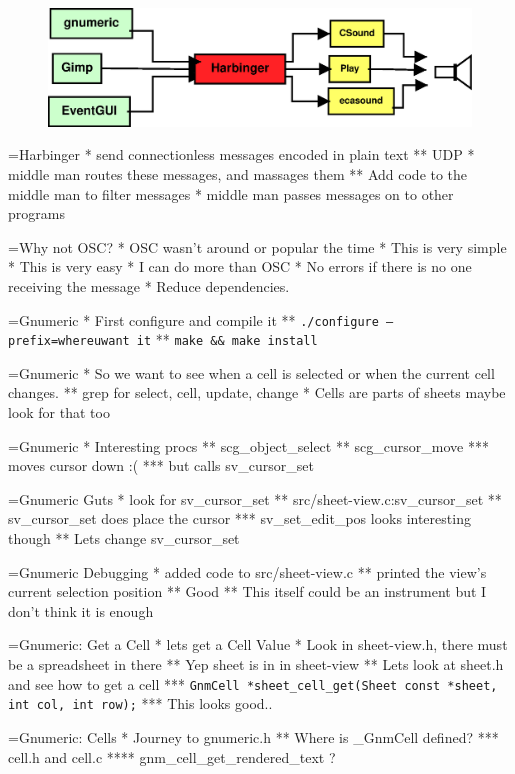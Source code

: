 \documentclass[titlepage,usenames,a4,landscape,semhelv]{seminar}
\begin{document}
\begin{slide}
\newslide

\begin{figure}
  \centering
\includegraphics[width=\textwidth]{harbinger-example}
\end{figure}


=Harbinger
* send connectionless messages encoded in plain text
** UDP
* middle man routes these messages, and massages them
** Add code to the middle man to filter messages
* middle man passes messages on to other programs
 
=Why not OSC?
* OSC wasn't around or popular the time
* This is very simple
* This is very easy
* I can do more than OSC
* No errors if there is no one receiving the message
* Reduce dependencies.

=Gnumeric
* First configure and compile it
** \texttt{./configure --prefix=whereuwant it}
** \texttt{make \&\& make install}

=Gnumeric
* So we want to see when a cell is selected or when the current cell changes.
** grep for select, cell, update, change
* Cells are parts of sheets maybe look for that too

=Gnumeric
* Interesting procs
** scg\_object\_select
** scg\_cursor\_move
*** moves cursor down :(
*** but calls sv\_cursor\_set

=Gnumeric Guts
* look for sv\_cursor\_set
** src/sheet-view.c:sv\_cursor\_set
** sv\_cursor\_set does place the cursor 
*** sv\_set\_edit\_pos looks interesting though
** Lets change sv\_cursor\_set

=Gnumeric Debugging
* added code to src/sheet-view.c
** printed the view's current selection position
** Good
** This itself could be an instrument but I don't think it is enough

=Gnumeric: Get a Cell
* lets get a Cell Value
* Look in sheet-view.h, there must be a spreadsheet in there
** Yep sheet is in in sheet-view
** Lets look at sheet.h and see how to get a cell
*** \texttt{GnmCell  *sheet\_cell\_get(Sheet const *sheet, int col, int row);}
*** This looks good..

=Gnumeric: Cells
* Journey to gnumeric.h
** Where is \_GnmCell defined?
*** cell.h and cell.c
**** gnm\_cell\_get\_rendered\_text ?


\end{slide}
\end{document}
